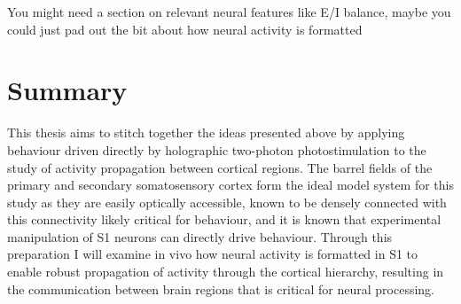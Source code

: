 You might need a section on relevant neural features like E/I balance, maybe you could just pad out the bit about how neural activity is formatted

\section{Summary}

This thesis aims to stitch together the ideas presented above by applying behaviour driven directly by holographic two-photon photostimulation to the study of activity propagation between cortical regions. The barrel fields of the primary and secondary somatosensory cortex form the ideal model system for this study as they are easily optically accessible,  known to be densely connected with this connectivity likely critical for behaviour, and it is known that experimental manipulation of S1 neurons can directly drive behaviour. Through this preparation I will examine in vivo how neural activity is formatted in S1 to enable robust propagation of activity through the cortical hierarchy, resulting in the communication between brain regions that is critical for neural processing.
